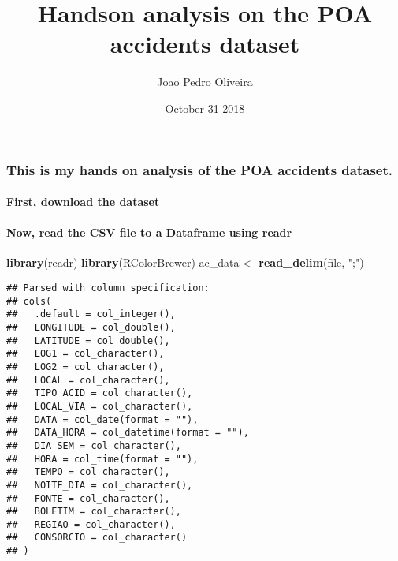 \documentclass[]{article}
\title{Handson analysis on the POA accidents dataset}
\author{Joao Pedro Oliveira}
\date{October 31 2018}
\newenvironment{Shaded}{\begin{snugshade}}{\end{snugshade}}
\newcommand{\KeywordTok}[1]{\textcolor[rgb]{0.13,0.29,0.53}{\textbf{#1}}}
\newcommand{\DataTypeTok}[1]{\textcolor[rgb]{0.13,0.29,0.53}{#1}}
\newcommand{\StringTok}[1]{\textcolor[rgb]{0.31,0.60,0.02}{#1}}
\newcommand{\ControlFlowTok}[1]{\textcolor[rgb]{0.13,0.29,0.53}{\textbf{#1}}}
\newcommand{\OperatorTok}[1]{\textcolor[rgb]{0.81,0.36,0.00}{\textbf{#1}}}
\newcommand{\NormalTok}[1]{#1}
\let\oldparagraph\paragraph
\renewcommand{\paragraph}[1]{\oldparagraph{#1}\mbox{}}
\begin{document}
\maketitle

\subsubsection{This is my hands on analysis of the POA accidents
dataset.}\label{this-is-my-hands-on-analysis-of-the-poa-accidents-dataset.}

\paragraph{First, download the
dataset}\label{first-download-the-dataset}

\begin{Shaded}
\end{Shaded}

\paragraph{Now, read the CSV file to a Dataframe using
readr}\label{now-read-the-csv-file-to-a-dataframe-using-readr}

\begin{Shaded}
\begin{Highlighting}[]
\KeywordTok{library}\NormalTok{(readr)}
\KeywordTok{library}\NormalTok{(RColorBrewer)}
\NormalTok{ac_data <-}\StringTok{ }\KeywordTok{read_delim}\NormalTok{(file, }\StringTok{";"}\NormalTok{)}
\end{Highlighting}
\end{Shaded}

\begin{verbatim}
## Parsed with column specification:
## cols(
##   .default = col_integer(),
##   LONGITUDE = col_double(),
##   LATITUDE = col_double(),
##   LOG1 = col_character(),
##   LOG2 = col_character(),
##   LOCAL = col_character(),
##   TIPO_ACID = col_character(),
##   LOCAL_VIA = col_character(),
##   DATA = col_date(format = ""),
##   DATA_HORA = col_datetime(format = ""),
##   DIA_SEM = col_character(),
##   HORA = col_time(format = ""),
##   TEMPO = col_character(),
##   NOITE_DIA = col_character(),
##   FONTE = col_character(),
##   BOLETIM = col_character(),
##   REGIAO = col_character(),
##   CONSORCIO = col_character()
## )
\end{verbatim}
\end{document}
